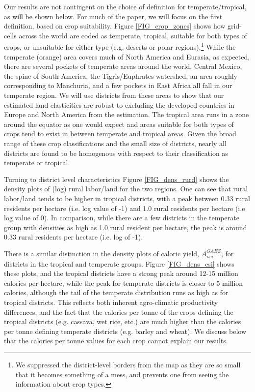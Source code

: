 \documentclass[11pt]{article}
\begin{document}
\vspace{.5cm} 
Our results are not contingent on the choice of definition for temperate/tropical, as will be shown below. For much of the paper, we will focus on the first definition, based on crop suitability. Figure \ref{FIG_crop_zones} shows how grid-cells across the world are coded as temperate, tropical, suitable for both types of crops, or unsuitable for either type (e.g. deserts or polar regions).\footnote{We suppressed the district-level borders from the map as they are so small that it becomes something of a mess, and prevents one from seeing the information about crop types.} While the temperate (orange) area covers much of North America and Eurasia, as expected, there are several pockets of temperate areas around the world. Central Mexico, the spine of South America, the Tigris/Euphrates watershed, an area roughly corresponding to Manchuria, and a few pockets in East Africa all fall in our temperate region. We will use districts from these areas to show that our estimated land elasticities are robust to excluding the developed countries in Europe and North America from the estimation. The tropical area runs in a zone around the equator as one would expect and areas suitable for both types of crops tend to exist in between temperate and tropical areas. Given the broad range of these crop classifications and the small size of districts, nearly all districts are found to be homogenous with respect to their classification as temperate or tropical.

Turning to district level characteristics Figure \ref{FIG_dens_rurd} shows the density plots of (log) rural labor/land for the two regions. One can see that rural labor/land tends to be higher in tropical districts, with a peak between 0.33 rural residents per hectare (i.e. log value of -1) and 1.0 rural residents per hectare (i.e log value of 0). In comparison, while there are a few districts in the temperate group with densities as high as 1.0 rural resident per hectare, the peak is around 0.33 rural residents per hectare (i.e. log of -1). 

There is a similar distinction in the density plots of caloric yield, $A_{isg}^{GAEZ}$, for districts in the tropical and temperate groups. Figure \ref{FIG_dens_csi} shows these plots, and the tropical districts have a strong peak around 12-15 million calories per hectare, while the peak for temperate districts is closer to 5 million calories, although the tail of the temperate distribution runs as high as for tropical districts. This reflects both inherent agro-climatic productivity differences, and the fact that the calories per tonne of the crops defining the tropical districts (e.g. cassava, wet rice, etc.) are much higher than the calories per tonne defining temperate districts (e.g. barley and wheat). We discuss below that the calories per tonne values for each crop cannot explain our results.
\end{document}
